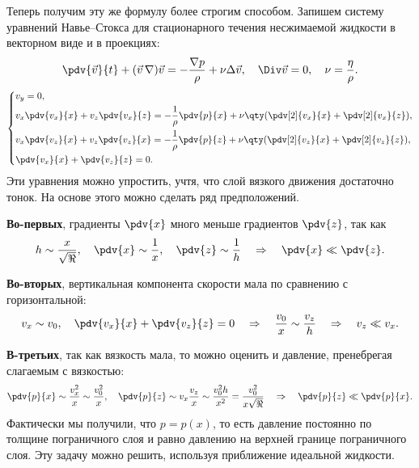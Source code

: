 Теперь получим эту же формулу более строгим способом.
Запишем систему уравнений Навье--Стокса для стационарного течения
несжимаемой жидкости в векторном виде и в проекциях:
\begin{equation}
    \pdv{\vec{v}}{t}+ (\vec{v}\,\nabla)\vec{v} =
        -\frac{\nabla p}{\rho} + \nu \Delta \vec{v}, \quad
        \Div \vec{v} = 0, \quad \nu = \frac{\eta}{\rho}.
\end{equation}
\begin{equation}
	\label{eq:sys}
    \left\{\begin{aligned}
        &v_y=0,\\
        &v_x \pdv{v_x}{x} + v_z \pdv{v_x}{z} =
            -\frac{1}{\rho} \pdv{p}{x} +
            \nu\qty(\pdv[2]{v_x}{x}+\pdv[2]{v_x}{z}),\\
        &v_x\pdv{v_z}{x}+v_z\pdv{v_z}{x}=
            -\frac{1}{\rho}\pdv{p}{z}+
            \nu\qty(\pdv[2]{v_z}{x}+\pdv[2]{v_z}{z}),\\
        &\pdv{v_x}{x}+\pdv{v_z}{z}=0.
	\end{aligned}\right.
\end{equation}
Эти уравнения можно упростить, учтя, что слой вязкого движения
достаточно тонок. На основе этого можно сделать ряд предположений.

\textbf{Во-первых},  градиенты $\pdv{x}$ много меньше градиентов
$\pdv{z}$, так как
\begin{equation}
    h\sim \frac{x}{\sqrt{\Re}}, \quad \pdv{x}\sim \frac{1}{x},
    \quad \pdv{z} \sim \frac{1}{h}
    \quad\Rightarrow\quad
    \pdv{x} \ll \pdv{z}.
\end{equation}

\textbf{Во-вторых}, вертикальная компонента скорости мала по сравнению с горизонтальной:
\begin{equation}
    v_x \sim v_0, \quad \pdv{v_x}{x}+\pdv{v_z}{z}=0
    \quad\Rightarrow\quad
    \frac{v_0}{x}\sim \frac{v_z}{h}
    \quad\Rightarrow\quad
    v_z \ll v_x.
\end{equation}

\textbf{В-третьих}, так как вязкость мала, то можно оценить и давление, пренебрегая слагаемым с вязкостью:
\begin{equation}
    \pdv{p}{x}\sim \frac{v_x^2}{x} \sim \frac{v_0^2}{x}, \quad
    \pdv{p}{z}\sim v_x \frac{v_z}{x} \sim \frac{v_0^2 h}{x^2}=
    \frac{v_0^2}{x \sqrt{\Re}}
    \quad\Rightarrow\quad
    \pdv{p}{z} \ll \pdv{p}{x}.
\end{equation}
Фактически мы получили, что $p=p(x)$, то есть давление постоянно по толщине пограничного слоя и равно давлению на верхней границе пограничного слоя. Эту задачу можно решить, используя приближение идеальной жидкости.

